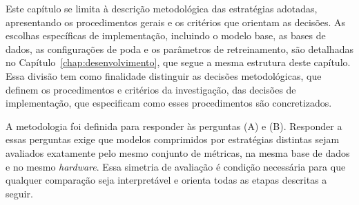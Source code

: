 Este capítulo se limita à descrição metodológica das estratégias adotadas, apresentando os procedimentos gerais e os critérios que orientam as decisões. As escolhas específicas de implementação, incluindo o modelo base, as bases de dados, as configurações de poda e os parâmetros de retreinamento, são detalhadas no Capítulo~\ref{chap:desenvolvimento}, que segue a mesma estrutura deste capítulo. Essa divisão tem como finalidade distinguir as decisões metodológicas, que definem os procedimentos e critérios da investigação, das decisões de implementação, que especificam como esses procedimentos são concretizados.

A metodologia foi definida para responder às perguntas (A) e (B).
Responder a essas perguntas exige que modelos comprimidos por
estratégias distintas sejam avaliados exatamente pelo mesmo conjunto de métricas, na mesma
base de dados e no mesmo
\textit{hardware}. Essa simetria de avaliação é condição necessária para que qualquer
comparação seja interpretável e orienta todas as etapas descritas a seguir.


